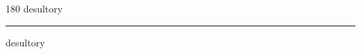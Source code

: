 
\begin{frame}
\begin{center}
\begin{turn}{180}
{\fontsize{2.5cm}{1em}\selectfont desultory}
\end{turn}
\vspace{1em}\par  
\hrule
\vspace{1em}\par  
{\fontsize{2.5cm}{1em}\selectfont desultory}
\end{center}
\end{frame}
